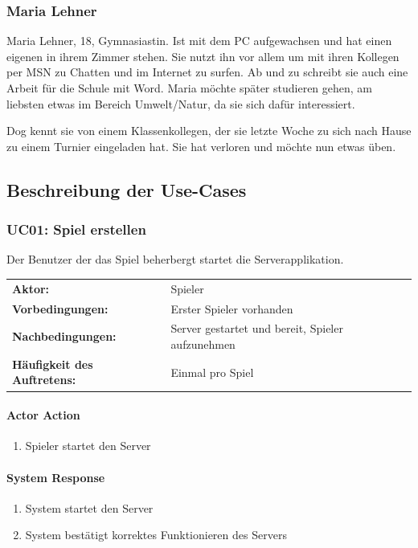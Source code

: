 \documentclass[a4paper,12pt,halfparskip,DIV14]{scrartcl}
\begin{document}
\subsubsection{Maria Lehner}\label{sub:maria_lehner} 

Maria Lehner, 18, Gymnasiastin. Ist mit dem PC aufgewachsen und hat einen eigenen in ihrem Zimmer stehen. Sie nutzt ihn vor allem um mit ihren Kollegen per MSN zu Chatten und im Internet zu surfen. Ab und zu schreibt sie auch eine Arbeit für die Schule mit Word. Maria möchte später studieren gehen, am liebsten etwas im Bereich Umwelt/Natur, da sie sich dafür interessiert. 

Dog kennt sie von einem Klassenkollegen, der sie letzte Woche zu sich nach Hause zu einem Turnier eingeladen hat. Sie hat verloren und möchte nun etwas üben.

\subsection{Beschreibung der Use-Cases}\label{sub:use_cases}
\subsubsection{UC01: Spiel erstellen}\label{ssub:uc01_spiel_erstellen}
Der Benutzer der das Spiel beherbergt startet die Serverapplikation.

\begin{tabular}{@{} l l @{}}
	\textbf{Aktor:}											&	Spieler \\
	\textbf{Vorbedingungen:}						& Erster Spieler vorhanden \\
	\textbf{Nachbedingungen:}						& Server gestartet und bereit, Spieler aufzunehmen \\
	\textbf{Häufigkeit des Auftretens:}	& Einmal pro Spiel \\
\end{tabular}

\vspace{0.5cm}

\begin{multicols}{2}
\raggedcolumns
\paragraph{Actor Action}
\begin{enumerate}
	\item[1] Spieler startet den Server
\end{enumerate}
\columnbreak
\paragraph{System Response}
\begin{enumerate}
	\item[2] System startet den Server
	\item[3] System bestätigt korrektes Funktionieren des Servers
\end{enumerate}
\end{multicols}
\end{document}
